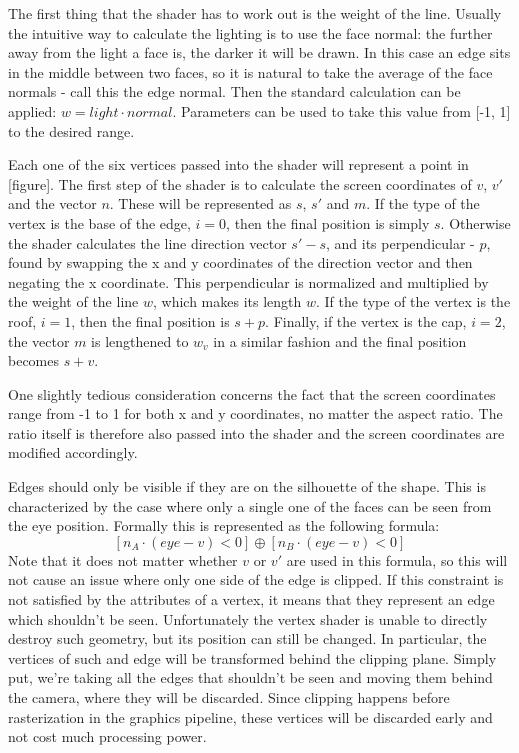 \documentclass[a4paper, 12pt]{article}
\begin{document}
The first thing that the shader has to work out is the weight of the line. Usually the intuitive way to calculate the lighting is to use the face normal: the further away from the light a face is, the darker it will be drawn. In this case an edge sits in the middle between two faces, so it is natural to take the average of the face normals - call this the edge normal. Then the standard calculation can be applied: $w = light \cdot normal$. Parameters can be used to take this value from [-1, 1] to the desired range.

Each one of the six vertices passed into the shader will represent a point in [figure]. The first step of the shader is to calculate the screen coordinates of  $v$, $v'$ and the vector $n$. These will be represented as $s$, $s'$ and $m$. If the type of the vertex is the base of the edge, $i=0$, then the final position is simply $s$. Otherwise the shader calculates the line direction vector $s'-s$, and its perpendicular - $p$, found by swapping the x and y coordinates of the direction vector and then negating the x coordinate. This perpendicular is normalized and multiplied by the weight of the line $w$, which makes its length $w$. If the type of the vertex is the roof, $i=1$, then the final position is $s+p$. Finally, if the vertex is the cap, $i=2$, the vector $m$ is lengthened to $w_v$ in a similar fashion and the final position becomes $s+v$.

One slightly tedious consideration concerns the fact that the screen coordinates range from -1 to 1 for both x and y coordinates, no matter the aspect ratio. The ratio itself is therefore also passed into the shader and the screen coordinates are modified accordingly.

Edges should only be visible if they are on the silhouette of the shape. This is characterized by the case where only a single one of the faces can be seen from the eye position. Formally this is represented as the following formula:
$$[n_A \cdot (eye-v) < 0] \oplus [n_B \cdot (eye-v) < 0]$$
Note that it does not matter whether $v$ or $v'$ are used in this formula, so this will not cause an issue where only one side of the edge is clipped. If this constraint is not satisfied by the attributes of a vertex, it means that they represent an edge which shouldn't be seen. Unfortunately the vertex shader is unable to directly destroy such geometry, but its position can still be changed. In particular, the vertices of such and edge will be transformed behind the clipping plane. Simply put, we're taking all the edges that shouldn't be seen and moving them behind the camera, where they will be discarded. Since clipping happens before rasterization in the graphics pipeline, these vertices will be discarded early and not cost much processing power.
\end{document}

